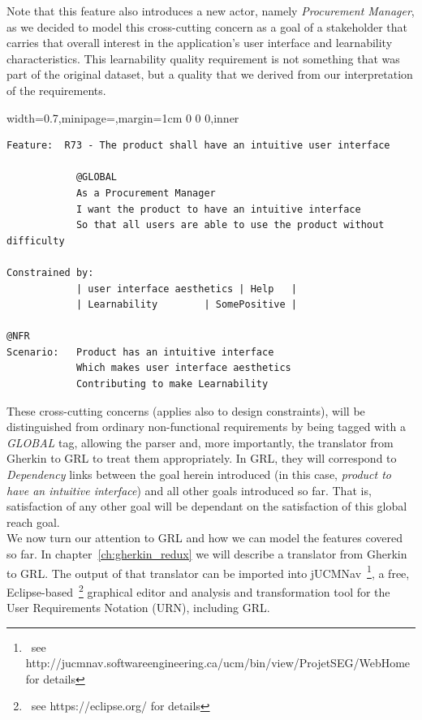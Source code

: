 \documentclass[dissertation,final]{softeng}
\newcommand{\nfrs}{non-functional requirements\xspace}
\newenvironment{featurecode}[1]
{ \lrbox\featurebox \begin{adjustbox}{width=#1\textwidth,minipage=\textwidth,margin=1cm 0 0 0,inner} }
{ \end{adjustbox}\endlrbox}
\newenvironment{featurelist}[2]
{
\newcommand{\setcaption}{\caption{#1}}
\newcommand{\setlabel}{\label{#2}}
}
{\begin{listing}[h!]\centering\usebox\featurebox\setcaption\setlabel\end{listing}}
\begin{document}
Note that this feature also introduces a new actor, namely \emph{Procurement Manager}, as we decided to model this cross-cutting concern as a goal of a stakeholder that carries that overall interest in the application's user interface and learnability characteristics. This learnability quality requirement is not something that was part of the original dataset, but a quality that we derived from our interpretation of the requirements.

\begin{featurelist}{Changes to Gherkin -- R73 -- The product shall have an intuitive user interface}{lst:feature_r73}
\begin{featurecode}{0.7}
\begin{verbatim}
Feature:  R73 - The product shall have an intuitive user interface
			
            @GLOBAL
            As a Procurement Manager
            I want the product to have an intuitive interface
            So that all users are able to use the product without difficulty
	
Constrained by:
            | user interface aesthetics | Help	 |
            | Learnability	      | SomePositive |
		
@NFR		
Scenario:   Product has an intuitive interface
            Which makes user interface aesthetics
            Contributing to make Learnability
\end{verbatim}
\end{featurecode}
\end{featurelist}

These cross-cutting concerns (applies also to design constraints), will be distinguished from ordinary \nfrs by being tagged with a \emph{GLOBAL} tag, allowing the parser and, more importantly, the translator from Gherkin to GRL to treat them appropriately. In GRL, they will correspond to \emph{Dependency} links between the goal herein introduced (in this case, \emph{product to have an intuitive interface}) and all other goals introduced so far. That is, satisfaction of any other goal will be dependant on the satisfaction of this global reach goal.\\

We now turn our attention to GRL and how we can model the features covered so far. In chapter~\ref{ch:gherkin_redux} we will describe a translator from Gherkin to GRL. The output of that translator can be imported into jUCMNav~\footnote{~see http://jucmnav.softwareengineering.ca/ucm/bin/view/ProjetSEG/WebHome for details}, a free, Eclipse-based~\footnote{~see https://eclipse.org/ for details} graphical editor and analysis and transformation tool for the User Requirements Notation (URN), including GRL.
\end{document}

